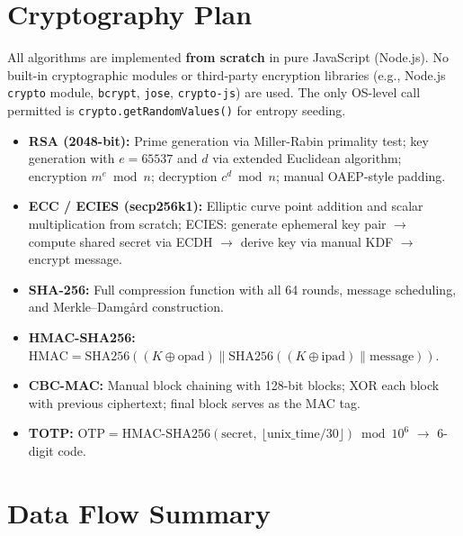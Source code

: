 \documentclass[12pt]{article}
\begin{document}
\section{Cryptography Plan}

All algorithms are implemented \textbf{from scratch} in pure JavaScript (Node.js). No built-in cryptographic modules or third-party encryption libraries (e.g., Node.js \texttt{crypto} module, \texttt{bcrypt}, \texttt{jose}, \texttt{crypto-js}) are used. The only OS-level call permitted is \texttt{crypto.getRandomValues()} for entropy seeding.

\begin{itemize}
    \item \textbf{RSA (2048-bit):} Prime generation via Miller-Rabin primality test; key generation with $e = 65537$ and $d$ via extended Euclidean algorithm; encryption $m^e \bmod n$; decryption $c^d \bmod n$; manual OAEP-style padding.
    \item \textbf{ECC / ECIES (secp256k1):} Elliptic curve point addition and scalar multiplication from scratch; ECIES: generate ephemeral key pair $\rightarrow$ compute shared secret via ECDH $\rightarrow$ derive key via manual KDF $\rightarrow$ encrypt message.
    \item \textbf{SHA-256:} Full compression function with all 64 rounds, message scheduling, and Merkle--Damg\r{a}rd construction.
    \item \textbf{HMAC-SHA256:} $\text{HMAC} = \text{SHA256}((K \oplus \text{opad}) \| \text{SHA256}((K \oplus \text{ipad}) \| \text{message}))$.
    \item \textbf{CBC-MAC:} Manual block chaining with 128-bit blocks; XOR each block with previous ciphertext; final block serves as the MAC tag.
    \item \textbf{TOTP:} $\text{OTP} = \text{HMAC-SHA256}(\text{secret},\ \lfloor\text{unix\_time} / 30\rfloor) \bmod 10^6$ $\rightarrow$ 6-digit code.
\end{itemize}

\section{Data Flow Summary}
\end{document}
